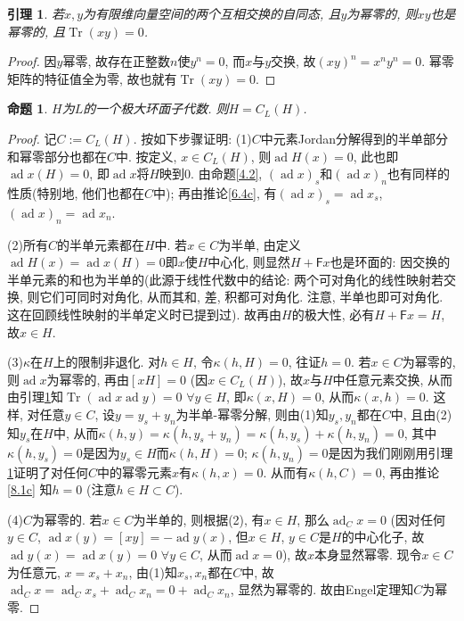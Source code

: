 \documentclass{ctexart}%
\newtheorem{lemma}{引理}
\newtheorem{proposition}{命题}
\theoremstyle{definition}
\theoremstyle{remark}
\DeclareMathOperator{\ad}{ad}
\DeclareMathOperator{\Tr}{Tr}
\begin{document}
\begin{lemma}\label{8.2l}
若$x,y$为有限维向量空间的两个互相交换的自同态, 且$y$为幂零的, 则$xy$也是幂零的, 且$\Tr(xy)=0$.
\end{lemma}
\begin{proof}
因$y$幂零, 故存在正整数$n$使$y^n=0$, 而$x$与$y$交换, 故$(xy)^n=x^ny^n=0$. 幂零矩阵的特征值全为零, 故也就有$\Tr(xy)=0$.
\end{proof}

\begin{proposition}\label{8.2}
$H$为$L$的一个极大环面子代数. 则$H=C_L(H)$.
\end{proposition}
\begin{proof}
记$C:=C_L(H)$. 按如下步骤证明:
(1)$C$中元素Jordan分解得到的半单部分和幂零部分也都在$C$中. 按定义, $x\in C_L(H)$, 则$\ad H(x)=0$, 此也即$\ad x(H)=0$, 即$\ad x$将$H$映到0. 由命题\ref{4.2}, $(\ad x)_s$和$(\ad x)_n$也有同样的性质(特别地, 他们也都在$C$中); 再由推论\ref{6.4c}, 有$(\ad x)_s=\ad x_s$, $(\ad x)_n=\ad x_n$.

(2)所有$C$的半单元素都在$H$中. 若$x \in C$为半单, 由定义$\ad H(x)=\ad x(H)=0$即$x$使$H$中心化, 则显然$H+\mathsf{F}x$也是环面的: 因交换的半单元素的和也为半单的(此源于线性代数中的结论: 两个可对角化的线性映射若交换, 则它们可同时对角化, 从而其和, 差, 积都可对角化. 注意, 半单也即可对角化. 这在回顾线性映射的半单定义时已提到过). 故再由$H$的极大性, 必有$H+\mathsf{F}x=H$, 故$x\in H$.

(3)$\kappa$在$H$上的限制非退化. 对$h\in H$, 令$\kappa(h,H)=0$, 往证$h=0$. 若$x\in C$为幂零的, 则$\ad x$为幂零的, 再由$[xH]=0$ (因$x\in C_L(H)$), 故$x$与$H$中任意元素交换, 从而由引理\ref{8.2l}知$\Tr(\ad x \ad y)=0$ $\forall y\in H$, 即$\kappa(x,H)=0$, 从而$\kappa(x,h)=0$. 这样, 对任意$y\in C$, 设$y=y_s+y_n$为半单-幂零分解, 则由(1)知$y_s, y_n$都在$C$中, 且由(2)知$y_s$在$H$中, 从而$\kappa(h,y)=\kappa(h,y_s+y_n)=\kappa(h,y_s)+\kappa(h,y_n)=0$, 其中$\kappa(h,y_s)=0$是因为$y_s\in H$而$\kappa(h,H)=0$; $\kappa(h,y_n)=0$是因为我们刚刚用引理\ref{8.2l}证明了对任何$C$中的幂零元素$x$有$\kappa(h,x)=0$. 从而有$\kappa(h,C)=0$, 再由推论\ref{8.1c} 知$h=0$ (注意$h\in H\subset C$).

(4)$C$为幂零的. 若$x\in C$为半单的, 则根据(2), 有$x\in H$, 那么$\ad_C x=0$ (因对任何$y\in C$, $\ad x(y)=[xy]=-\ad y(x)$, 但$x\in H$, $y\in C$是$H$的中心化子, 故$\ad y(x)=\ad x(y)=0$ $\forall y\in C$, 从而$\ad x=0$), 故$x$本身显然幂零. 现令$x\in C$为任意元, $x=x_s+x_n$, 由(1)知$x_s,x_n$都在$C$中, 故$\ad_C x=\ad_C x_s+\ad_C x_n = 0+\ad_C x_n$, 显然为幂零的. 故由Engel定理知$C$为幂零. 


\end{proof}
\end{document}
